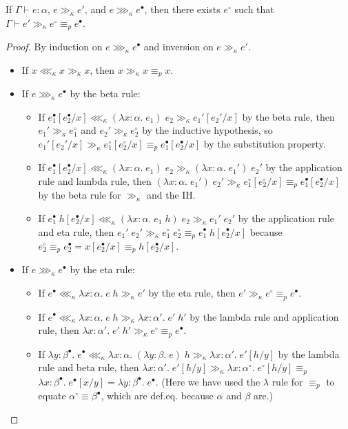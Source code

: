 \begin{lemma}\label{thm:tri}
If $\Gamma\vdash e:\alpha$, $e\gg_\kappa e'$, and $e\ggg_\kappa e^\bullet$, then there exists $e^\circ$ such that $\Gamma\vdash e'\gg_\kappa e^\circ\equiv_p e^\bullet$.
\end{lemma}
\begin{proof}
By induction on $e\ggg_\kappa e^\bullet$ and inversion on $e\gg_\kappa e'$.
\begin{itemize}
\item If $x\lll_\kappa x\gg_\kappa x$, then $x\gg_\kappa x\equiv_p x$.
\item If $e\ggg_\kappa e^\bullet$ by the beta rule:
\begin{itemize}
\item If $e_1^\bullet[e_2^\bullet/x]\lll_\kappa(\lambda x:\alpha.\;e_1)\;e_2\gg_\kappa e_1'[e_2'/x]$ by the beta rule, then $e_1'\gg_\kappa e_1^\circ$ and $e_2'\gg_\kappa e_2^\circ$ by the inductive hypothesis, so $e_1'[e_2'/x]\gg_\kappa e_1^\circ[e_2^\circ/x]\equiv_p e_1^\bullet[e_2^\bullet/x]$ by the substitution property.
\item If $e_1^\bullet[e_2^\bullet/x]\lll_\kappa(\lambda x:\alpha.\;e_1)\;e_2\gg_\kappa (\lambda x:\alpha.\;e_1')\;e_2'$ by the application rule and lambda rule, then $(\lambda x:\alpha.\;e_1')\;e_2'\gg_\kappa e_1^\circ[e_2^\circ/x]\equiv_p e_1^\bullet[e_2^\bullet/x]$ by the beta rule for $\gg_\kappa$ and the IH.
\item If $e_1^\bullet\;h[e_2^\bullet/x]\lll_\kappa(\lambda x:\alpha.\;e_1\;h)\;e_2\gg_\kappa e_1'\;e_2'$ by the application rule and eta rule, then $e_1'\;e_2'\gg_\kappa e_1^\circ\;e_2^\circ\equiv_p e_1^\bullet\;h[e_2^\bullet/x]$ because $e_2^\circ\equiv_p e_2^\bullet=x[e_2^\bullet/x]\equiv_p h[e_2^\bullet/x]$.
\end{itemize}
\item If $e\ggg_\kappa e^\bullet$ by the eta rule:
\begin{itemize}
\item If $e^\bullet\lll_\kappa\lambda x:\alpha.\;e\;h\gg_\kappa e'$ by the eta rule, then $e'\gg_\kappa e^\circ\equiv_p e^\bullet$.
\item If $e^\bullet\lll_\kappa\lambda x:\alpha.\;e\;h\gg_\kappa \lambda x:\alpha'.\;e'\;h'$ by the lambda rule and application rule, then $\lambda x:\alpha'.\;e'\;h'\gg_\kappa e^\circ\equiv_p e^\bullet$.
\item If $\lambda y:\beta^\bullet.\;e^\bullet\lll_\kappa\lambda x:\alpha.\;(\lambda y:\beta.\;e)\;h\gg_\kappa \lambda x:\alpha'.\;e'[h/y]$ by the lambda rule and beta rule, then $\lambda x:\alpha'.\;e'[h/y]\gg_\kappa \lambda x:\alpha^\circ.\;e^\circ[h/y]\equiv_p$\\$\lambda x:\beta^\bullet.\;e^\bullet[x/y]=\lambda y:\beta^\bullet.\;e^\bullet$. (Here we have used the $\lambda$ rule for $\equiv_p$ to equate $\alpha^\circ\equiv\beta^\bullet$, which are def.eq. because $\alpha$ and $\beta$ are.)

\end{itemize}
\end{itemize}
\end{proof}
